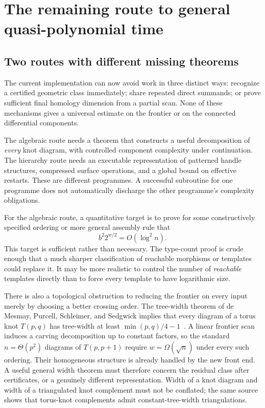 \section{The remaining route to general quasi-polynomial time}
\label{sec:route}

\subsection{Two routes with different missing theorems}
The current implementation can now avoid work in three distinct ways:
recognize a certified geometric class immediately; share repeated direct
summands; or prove sufficient final homology dimension from a partial scan.
None of these mechanisms gives a universal estimate on the frontier or on
the connected differential components.

The algebraic route needs a theorem that constructs a useful decomposition
of \emph{every} knot diagram, with controlled component complexity under
continuation. The hierarchy route needs an executable representation of
patterned handle structures, compressed surface operations, and a global
bound on effective restarts. These are different programmes. A successful
subroutine for one programme does not automatically discharge the other
programme's complexity obligations.

For the algebraic route, a quantitative target is to prove for some
constructively specified ordering or more general assembly rule that
\[
 b^2 2^{w/2}=O(\log^2 n).
\]
This target is sufficient rather than necessary. The type-count proof is
crude enough that a much sharper classification of reachable morphisms or
templates could replace it. It may be more realistic to control the number
of \emph{reachable} templates directly than to force every template to
have logarithmic size.

There is also a topological obstruction to reducing the frontier on every
input merely by choosing a better crossing order. The tree-width theorem
of de Mesmay, Purcell, Schleimer, and Sedgwick implies that every diagram
of a torus knot $T(p,q)$ has tree-width at least
$\min(p,q)/4-1$~\cite[Theorem 3.7]{treewidth}. A linear frontier scan
induces a carving decomposition up to constant factors, so the standard
$n=\Theta(p^2)$ diagrams of $T(p,p+1)$ require $w=\Omega(\sqrt n)$
under every such ordering. Their homogeneous structure is already handled
by the new front end. A useful general width theorem must therefore concern
the residual class after certificates, or a genuinely different
representation. Width of a knot diagram and width of a triangulated knot
complement must not be conflated; the same source shows that torus-knot
complements admit constant-tree-width triangulations.

